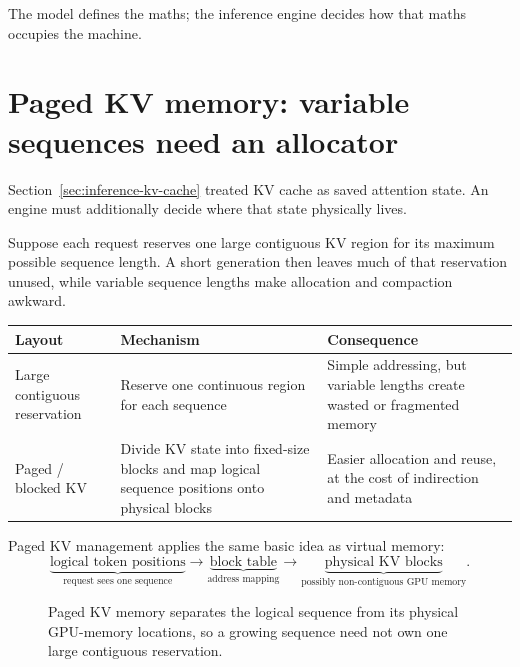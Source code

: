 \begin{calloutmemoryhook}
The model defines the maths; the inference engine decides how that maths occupies the machine.
\end{calloutmemoryhook}


\section{Paged KV memory: variable sequences need an allocator}
\label{sec:inference-paged-kv}
Section~\ref{sec:inference-kv-cache} treated KV cache as saved attention state.
An engine must additionally decide where that state physically lives.

Suppose each request reserves one large contiguous KV region for its maximum possible sequence length.
A short generation then leaves much of that reservation unused, while variable sequence lengths make allocation and compaction awkward.

\begin{center}
\small
\begin{tabularx}{.96\linewidth}{@{}L{.22\linewidth}YY@{}}
\toprule
\textbf{Layout} & \textbf{Mechanism} & \textbf{Consequence} \\
\midrule
Large contiguous reservation
& Reserve one continuous region for each sequence
& Simple addressing, but variable lengths create wasted or fragmented memory \\
Paged / blocked KV
& Divide KV state into fixed-size blocks and map logical sequence positions onto physical blocks
& Easier allocation and reuse, at the cost of indirection and metadata \\
\bottomrule
\end{tabularx}
\end{center}

Paged KV management applies the same basic idea as virtual memory:
\[
\underbrace{\text{logical token positions}}_{\text{request sees one sequence}}
\longrightarrow
\underbrace{\text{block table}}_{\text{address mapping}}
\longrightarrow
\underbrace{\text{physical KV blocks}}_{\text{possibly non-contiguous GPU memory}}.
\]

\begin{figure}[htbp]
\centering
{}
\caption{Paged KV memory separates the logical sequence from its physical GPU-memory locations, so a growing sequence need not own one large contiguous reservation.}
\label{fig:paged-kv}
\end{figure}

